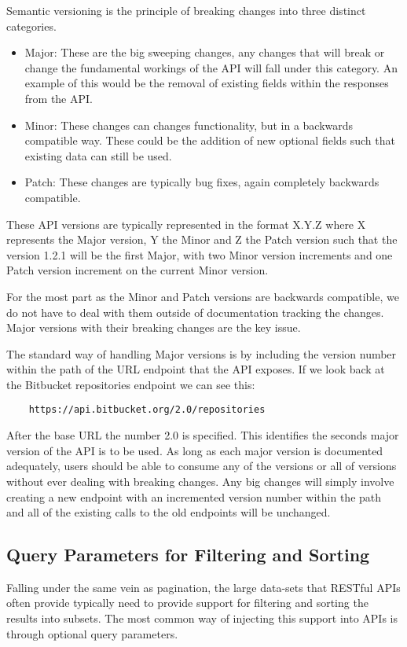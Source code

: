 Semantic versioning is the principle of breaking changes into three distinct categories.
\begin{itemize}
    \item Major: These are the big sweeping changes, any changes that will break or change the fundamental workings of the API will fall under this category. An example of this would be the removal of existing fields within the responses from the API.
    \item Minor: These changes can changes functionality, but in a backwards compatible way. These could be the addition of new optional fields such that existing data can still be used. 
    \item Patch: These changes are typically bug fixes, again completely backwards compatible.
\end{itemize}
These API versions are typically represented in the format X.Y.Z where X represents the Major version, Y the Minor and Z the Patch version such that the version 1.2.1 will be the first Major, with two Minor version increments and one Patch version increment on the current Minor version.

For the most part as the Minor and Patch versions are backwards compatible, we do not have to deal with them outside of documentation tracking the changes. Major versions with their breaking changes are the key issue.

The standard way of handling Major versions is by including the version number within the path of the URL endpoint that the API exposes. If we look back at the Bitbucket repositories endpoint we can see this:
\begin{verbatim}
    https://api.bitbucket.org/2.0/repositories
\end{verbatim}
After the base URL the number 2.0 is specified. This identifies the seconds major version of the API is to be used. As long as each major version is documented adequately, users should be able to consume any of the versions or all of versions without ever dealing with breaking changes. Any big changes will simply involve creating a new endpoint with an incremented version number within the path and all of the existing calls to the old endpoints will be unchanged.
\subsection{Query Parameters for Filtering and Sorting}
Falling under the same vein as pagination, the large data-sets that RESTful APIs often provide typically need to provide support for filtering and sorting the results into subsets. The most common way of injecting this support into APIs is through optional query parameters.

